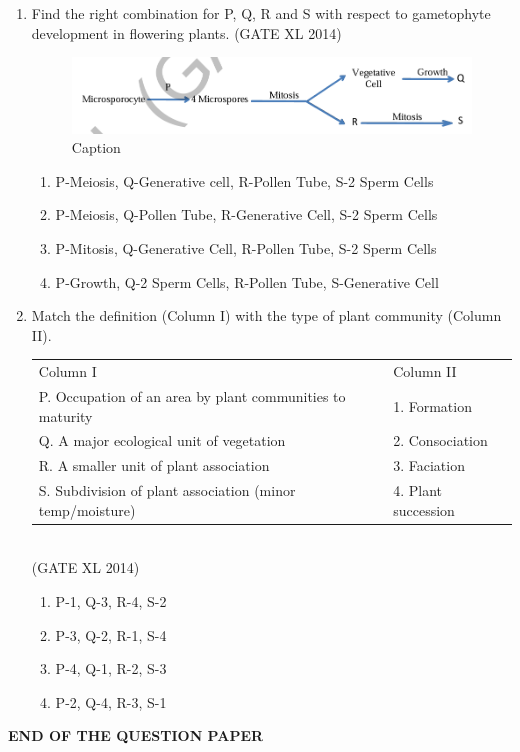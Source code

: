 \documentclass[journal,12pt,onecolumn]{IEEEtran}
\theoremstyle{remark}
\begin{document}
\begin{enumerate}
    \item Find the right combination for P, Q, R and S with respect to gametophyte development in flowering plants.  
   \hfill (GATE XL 2014)
   \begin{figure}[H]
       \centering
       \includegraphics[width=0.9\columnwidth]{fig34.png}
       \caption{Caption}
       \label{fig:placeholder}
   \end{figure}
    \begin{multicols}{2}
    \begin{enumerate}
        \item P-Meiosis, Q-Generative cell, R-Pollen Tube, S-2 Sperm Cells  
        \item P-Meiosis, Q-Pollen Tube, R-Generative Cell, S-2 Sperm Cells  
        \item P-Mitosis, Q-Generative Cell, R-Pollen Tube, S-2 Sperm Cells  
        \item P-Growth, Q-2 Sperm Cells, R-Pollen Tube, S-Generative Cell  
    \end{enumerate}
    \end{multicols}


    \item Match the definition (Column I) with the type of plant community (Column II).  

    \begin{tabular}{ll}
    Column I & Column II \\
    P. Occupation of an area by plant communities to maturity & 1. Formation \\
    Q. A major ecological unit of vegetation & 2. Consociation \\
    R. A smaller unit of plant association & 3. Faciation \\
    S. Subdivision of plant association (minor temp/moisture) & 4. Plant succession \\
    \end{tabular}\\
   \hfill (GATE XL 2014)
    \begin{multicols}{2}
    \begin{enumerate}
        \item P-1, Q-3, R-4, S-2  
        \item P-3, Q-2, R-1, S-4  
        \item P-4, Q-1, R-2, S-3  
        \item P-2, Q-4, R-3, S-1  
    \end{enumerate}
    \end{multicols}
\end{enumerate}
\begin{center}
    \textbf{END OF THE QUESTION PAPER}
\end{center}
\clearpage
\end{document}
